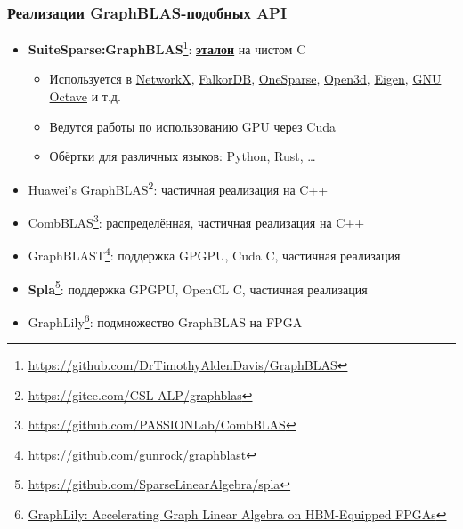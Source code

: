\documentclass[xcolor=table,aspectratio=169]{beamer}
\begin{document}
\begin{frame}[fragile]
  \frametitle{Реализации GraphBLAS-подобных API}
  \begin{itemize}
      \item \textbf{SuiteSparse:GraphBLAS}\footnote{\url{https://github.com/DrTimothyAldenDavis/GraphBLAS}}: \underline{\textbf{эталон}} на чистом C
      \begin{itemize}
        \item Используется в \href{https://networkx.org/}{NetworkX}, \href{https://www.falkordb.com/}{FalkorDB}, \href{https://onesparse.com/}{OneSparse}, \href{https://www.open3d.org/}{Open3d}, \href{http://eigen.tuxfamily.org/}{Eigen}, \href{https://octave.org/}{GNU Octave} и т.д.
        \item Ведутся работы по использованию GPU через Cuda
        \item Обёртки для различных языков: Python, Rust, \ldots
      \end{itemize}
      \item Huawei's GraphBLAS\footnote{\url{https://gitee.com/CSL-ALP/graphblas}}: частичная реализация на C++
      \item CombBLAS\footnote{\url{https://github.com/PASSIONLab/CombBLAS}}: распределённая, частичная реализация на C++
      \item GraphBLAST\footnote{\url{https://github.com/gunrock/graphblast}}: поддержка GPGPU, Cuda C, частичная реализация
      \item \textbf{Spla}\footnote{\url{https://github.com/SparseLinearAlgebra/spla}}: поддержка GPGPU, OpenCL C, частичная реализация
      \item GraphLily\footnote{\href{https://dl.acm.org/doi/10.1109/ICCAD51958.2021.9643582}{GraphLily: Accelerating Graph Linear Algebra on HBM-Equipped FPGAs}}: подмножество GraphBLAS на FPGA      
  \end{itemize}
\end{frame}
\end{document}
